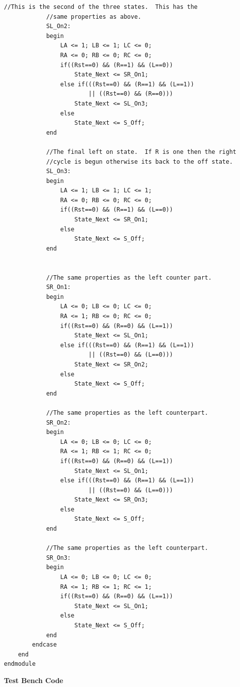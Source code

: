 \documentclass[12pt]{report}
\begin{document}
\begin{Verbatim}[frame=single, fontsize=\small]
			//This is the second of the three states.  This has the 
			//same properties as above.
			SL_On2:
			begin
				LA <= 1; LB <= 1; LC <= 0;
				RA <= 0; RB <= 0; RC <= 0;
				if((Rst==0) && (R==1) && (L==0))
					State_Next <= SR_On1;
				else if(((Rst==0) && (R==1) && (L==1))
						|| ((Rst==0) && (R==0)))
					State_Next <= SL_On3;
				else
					State_Next <= S_Off;
			end
			
			//The final left on state.  If R is one then the right 
			//cycle is begun otherwise its back to the off state.
			SL_On3:
			begin
				LA <= 1; LB <= 1; LC <= 1;
				RA <= 0; RB <= 0; RC <= 0;
				if((Rst==0) && (R==1) && (L==0))
					State_Next <= SR_On1;
				else
					State_Next <= S_Off;
			end
			
			
			//The same properties as the left counter part.
			SR_On1:
			begin
				LA <= 0; LB <= 0; LC <= 0;
				RA <= 1; RB <= 0; RC <= 0;
				if((Rst==0) && (R==0) && (L==1))
					State_Next <= SL_On1;
				else if(((Rst==0) && (R==1) && (L==1))
						|| ((Rst==0) && (L==0)))
					State_Next <= SR_On2;
				else
					State_Next <= S_Off;
			end
			
			//The same properties as the left counterpart.
			SR_On2:
			begin
				LA <= 0; LB <= 0; LC <= 0;
				RA <= 1; RB <= 1; RC <= 0;
				if((Rst==0) && (R==0) && (L==1))
					State_Next <= SL_On1;
				else if(((Rst==0) && (R==1) && (L==1))
						|| ((Rst==0) && (L==0)))
					State_Next <= SR_On3;
				else
					State_Next <= S_Off;
			end
			
			//The same properties as the left counterpart.
			SR_On3:
			begin
				LA <= 0; LB <= 0; LC <= 0;
				RA <= 1; RB <= 1; RC <= 1;
				if((Rst==0) && (R==0) && (L==1))
					State_Next <= SL_On1;
				else
					State_Next <= S_Off;
			end
		endcase
	end
endmodule
		\end{Verbatim}
	\textbf{Test Bench Code}
\end{document}
